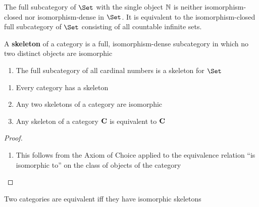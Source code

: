 \documentclass[11pt]{article}
\begin{document}
\begin{examplle}[]
The full subcategory of \(\Set\) with the single object \(\mathbb{N}\) is neither
isomorphism-closed nor isomorphism-dense in \(\Set\). It is equivalent to the
isomorphism-closed full subcategory of \(\Set\) consisting of all countable
infinite sets.
\end{examplle}

\begin{definition}[]
A \textbf{skeleton} of a category is a full, isomorphism-dense subcategory in which no
two distinct objects are isomorphic
\end{definition}

\begin{examplle}[]
\begin{enumerate}
\item The full subcategory of all cardinal numbers is a skeleton for \(\Set\)
\end{enumerate}
\end{examplle}

\begin{proposition}[]
\begin{enumerate}
\item Every category has a skeleton
\item Any two skeletons of a category are isomorphic
\item Any skeleton of a category \(\operatorname{\textbf{C}}\) is equivalent to \(\operatorname{\textbf{C}}\)
\end{enumerate}
\end{proposition}

\begin{proof}
\begin{enumerate}
\item This follows from the Axiom of Choice applied to the equivalence relation
``is isomorphic to'' on the class of objects of the category
\end{enumerate}
\end{proof}

\begin{corollary}[]
Two categories are equivalent iff they have isomorphic skeletons
\end{corollary}
\end{document}
